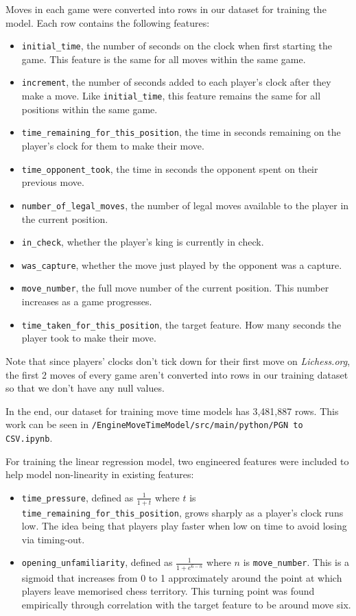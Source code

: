 \documentclass[12pt,titlepage,a4paper]{article}
\begin{document}
    Moves in each game were converted into rows in our dataset for training the model. Each row contains the following features:

    \begin{itemize}[noitemsep]
    	\item \texttt{initial\_time}, the number of seconds on the clock when first starting the game. This feature is the same for all moves within the same game.
        \item \texttt{increment}, the number of seconds added to each player's clock after they make a move. Like \texttt{initial\_time}, this feature remains the same for all positions within the same game.
        \item \texttt{time\_remaining\_for\_this\_position}, the time in seconds remaining on the player's clock for them to make their move.
        \item \texttt{time\_opponent\_took}, the time in seconds the opponent spent on their previous move.
        \item \texttt{number\_of\_legal\_moves}, the number of legal moves available to the player in the current position.
        \item \texttt{in\_check}, whether the player's king is currently in check.
        \item \texttt{was\_capture}, whether the move just played by the opponent was a capture.
        \item \texttt{move\_number}, the full move number of the current position. This number increases as a game progresses.
        \item \texttt{time\_taken\_for\_this\_position}, the target feature. How many seconds the player took to make their move.
    \end{itemize}

    Note that since players' clocks don't tick down for their first move on \textit{Lichess.org}, the first 2 moves of every game aren't converted into rows in our training dataset so that we don't have any null values.

    In the end, our dataset for training move time models has 3,481,887 rows. This work can be seen in \texttt{/EngineMoveTimeModel/src/main/python/PGN to CSV.ipynb}.

    For training the linear regression model, two engineered features were included to help model non-linearity in existing features:

    \begin{itemize}
        \item \texttt{time\_pressure}, defined as $\frac{1}{1 + t}$ where $t$ is \texttt{time\_remaining\_for\_this\_position}, grows sharply as a player's clock runs low. The idea being that players play faster when low on time to avoid losing via timing-out.
        \item \texttt{opening\_unfamiliarity}, defined as $\frac{1}{1 + e^{6 - n}}$ where $n$ is \texttt{move\_number}. This is a sigmoid that increases from 0 to 1 approximately around the point at which players leave memorised chess territory. This turning point was found empirically through correlation with the target feature to be around move six.
    \end{itemize}
\end{document}

